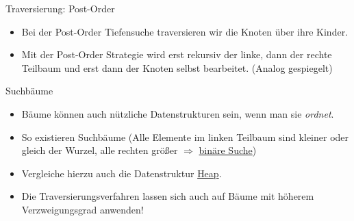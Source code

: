 \begin{frame}{Traversierung: Post-Order}
    \begin{itemize}[<+(1)->]
        \item Bei der Post-Order Tiefensuche traversieren wir die Knoten über ihre Kinder.
        \item Mit der Post-Order Strategie wird erst rekursiv der linke, dann der rechte Teilbaum und erst dann der Knoten selbst bearbeitet.\pause{} (Analog gespiegelt)
    \end{itemize}
    \pause{}\begin{center}
    \end{center}
\end{frame}

\begin{frame}{Suchbäume}
    \begin{itemize}[<+(1)->]
        \item Bäume können auch nützliche Datenstrukturen sein, wenn man sie \emph{ordnet}.
        \item So existieren Suchbäume (Alle Elemente im linken Teilbaum sind kleiner oder gleich der Wurzel, alle rechten größer \(\Rightarrow\) \hyperlink{mrk:binsearch}{binäre Suche})
        \item Vergleiche hierzu auch die Datenstruktur \hyperlink{mrk:Heap}{Heap}.
        \item Die Traversierungsverfahren lassen sich auch auf Bäume mit höherem Verzweigungsgrad anwenden!
    \end{itemize}
\end{frame}

